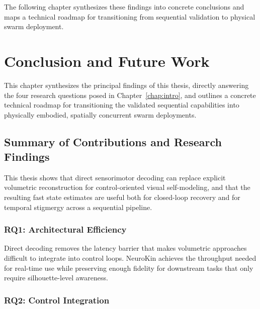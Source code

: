 \documentclass[12pt,a4paper,oneside]{report}
\begin{document}
The following chapter synthesizes these findings into concrete conclusions and maps a technical roadmap for transitioning from sequential validation to physical swarm deployment.





















\chapter{Conclusion and Future Work}
\label{chap:conclusion_future_work}

This chapter synthesizes the principal findings of this thesis, directly answering the four research questions posed in Chapter~\ref{chap:intro}, and outlines a concrete technical roadmap for transitioning the validated sequential capabilities into physically embodied, spatially concurrent swarm deployments.

\section{Summary of Contributions and Research Findings}

This thesis shows that direct sensorimotor decoding can replace explicit volumetric reconstruction for control-oriented visual self-modeling, and that the resulting fast state estimates are useful both for closed-loop recovery and for temporal stigmergy across a sequential pipeline.

\subsection{RQ1: Architectural Efficiency}
\label{subsec:rq1_architectural_efficiency_1}

Direct decoding removes the latency barrier that makes volumetric approaches difficult to integrate into control loops. NeuroKin achieves the throughput needed for real-time use while preserving enough fidelity for downstream tasks that only require silhouette-level awareness.

\subsection{RQ2: Control Integration}
\label{subsec:rq2_control_integration_1}
\end{document}
